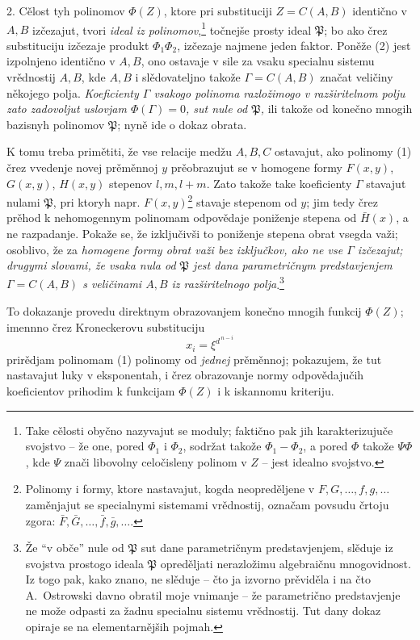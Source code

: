\documentclass[11pt]{article}
\begin{document}
2. Cělost tyh polinomov $\Phi(Z)$, ktore pri substituciji $Z=C(A,B)$ identično v $A,B$ izčezajut, tvori \emph{ideal iz polinomov},\footnote{Take cělosti obyčno nazyvajut se moduly; faktično pak jih karakterizujuče svojstvo -- že one, pored $\Phi_1$ i $\Phi_2$, sodržat takože $\Phi_1-\Phi_2$, a pored $\Phi$ takože $\Psi\Phi$, kde $\Psi$ znači libovolny celočisleny polinom v $Z$ -- jest idealno svojstvo.} točnejše prosty ideal $\mathfrak P$; bo ako črez substituciju izčezaje produkt $\Phi_1\Phi_2$, izčezaje najmene jeden faktor. Poněže (2) jest izpolnjeno identično v $A,B$, ono ostavaje v sile za vsaku specialnu sistemu vrědnostij $A,B$, kde $A,B$ i slědovateljno takože $\Gamma=C(A,B)$ značat veličiny někojego polja. \emph{Koeficienty $\Gamma$ vsakogo polinoma razložimogo v razširitelnom polju zato zadovoljut uslovjam $\Phi(\Gamma)=0$, sut nule od $\mathfrak P$,} ili takože od konečno mnogih bazisnyh polinomov $\mathfrak P$; nyně ide o dokaz obrata.

K tomu treba primětiti, že vse relacije medžu $A,B,C$ ostavajut, ako polinomy (1) črez vvedenje novej prěměnnoj $y$ prěobrazujut se v homogene formy $F(x,y)$, $G(x,y)$, $H(x,y)$ stepenov $l,m,l+m$. Zato takože take koeficienty $\Gamma$ stavajut nulami $\mathfrak P$, pri ktoryh napr. $F(x,y)$\footnote{Polinomy i formy, ktore nastavajut, kogda neopreděljene v $F,G,\ldots,f,g,\ldots$ zaměnjajut se specialnymi sistemami vrědnostij, označam povsudu črtoju zgora: $\bar F,\bar G,\ldots,\bar f,\bar g,\ldots$.} stavaje stepenom od $y$; jim tedy črez prěhod k nehomogennym polinomam odpovědaje poniženje stepena od $\bar H(x)$, a ne razpadanje. Pokaže se, že izključivši to poniženje stepena obrat vsegda važi; osoblivo, že za \emph{homogene formy obrat važi bez izključkov, ako ne vse $\Gamma$ izčezajut; drugymi slovami, že vsaka nula od $\mathfrak P$ jest dana parametričnym predstavjenjem $\Gamma=C(A,B)$ s veličinami $A,B$ iz razširitelnogo polja}.\footnote{Že ``v obče'' nule od $\mathfrak P$ sut dane parametričnym predstavjenjem, slěduje iz svojstva prostogo ideala $\mathfrak P$ opreděljati nerazložimu algebraičnu mnogovidnost. Iz togo pak, kako znano, ne slěduje -- čto ja izvorno prěviděla i na čto \mbox{A.~Ostrowski} davno obratil moje vnimanje -- že parametrično predstavjenje ne može odpasti za žadnu specialnu sistemu vrědnostij. Tut dany dokaz opiraje se na elementarnějših pojmah.}

To dokazanje provedu direktnym obrazovanjem konečno mnogih funkcij $\Phi(Z)$; imennno črez Kroneckerovu substituciju
\[
 x_i=\xi^{d^{\,n-i}}
\]
prirědjam polinomam (1) polinomy od \emph{jednej} prěměnnoj; pokazujem, že tut nastavajut luky v eksponentah, i črez obrazovanje normy odpovědajučih koeficientov prihodim k funkcijam $\Phi(Z)$ i k iskannomu kriteriju.
\end{document}
